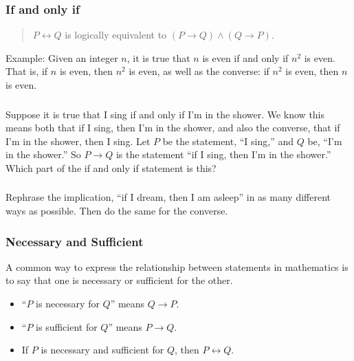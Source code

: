 \documentclass[11pt, compress]{beamer}
\renewcommand{\iff}{\leftrightarrow}
\newcommand{\imp}{\rightarrow}
\begin{document}
\begin{frame}
\frametitle{If and only if}
 \begin{quote}%
\(P \iff Q\) is logically equivalent to \((P \imp Q) \wedge (Q \imp P)\).
\end{quote}
 
\pause \vfill 

Example: Given an integer \(n\), it is true that \(n\) is even if and only if \(n^2\) is even. That is, if \(n\) is even, then \(n^2\) is even, as well as the converse: if \(n^2\) is even, then \(n\) is even.
\end{frame}
 
\begin{frame}
\frametitle{}
\begin{example}[0.2.7]Suppose it is true that I sing if and only if I'm in the shower. We know this means both that if I sing, then I'm in the shower, and also the converse, that if I'm in the shower, then I sing. Let \(P\) be the statement, ``I sing,'' and \(Q\) be, ``I'm in the shower.'' So \(P \imp Q\) is the statement ``if I sing, then I'm in the shower.'' Which part of the if and only if statement is this?
\end{example}
\end{frame}
 
\begin{frame}
\frametitle{}
\begin{example}[0.2.8]Rephrase the implication, ``if I dream, then I am asleep'' in as many different ways as possible. Then do the same for the converse.
\end{example}
\end{frame}
 
\begin{frame}
\frametitle{Necessary and Sufficient}
 A common way to express the relationship between statements in mathematics is to say that one is necessary or sufficient for the other.
\pause 

\begin{itemize}[<+->]
\item{} ``\(P\) is necessary for \(Q\)'' means \(Q \imp P\).

\item{} ``\(P\) is sufficient for \(Q\)'' means \(P \imp Q\).

\item{} If \(P\) is necessary and sufficient for \(Q\), then \(P \iff Q\).

\end{itemize}

\end{frame}
 
\end{document}
